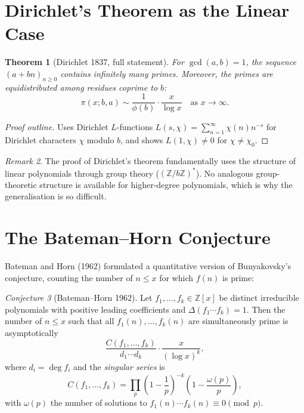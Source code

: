 \documentclass[12pt,a4paper]{amsart}
\newtheorem{theorem}{Theorem}[section]
\theoremstyle{definition}
\theoremstyle{remark}
\newtheorem{remark}[theorem]{Remark}
\newtheorem{conjecture}[theorem]{Conjecture}
\newcommand{\Z}{\mathbb{Z}}
\begin{document}
\section{Dirichlet's Theorem as the Linear Case}

\begin{theorem}[Dirichlet 1837, full statement]
For $\gcd(a, b) = 1$, the sequence $(a + bn)_{n \geq 0}$ contains infinitely
many primes.
Moreover, the primes are equidistributed among residues coprime to $b$:
\[
  \pi(x; b, a) \sim \frac{1}{\phi(b)} \cdot \frac{x}{\log x} \quad
  \text{as } x \to \infty.
\]
\end{theorem}

\begin{proof}[Proof outline]
Uses Dirichlet $L$-functions $L(s, \chi) = \sum_{n=1}^\infty \chi(n) n^{-s}$
for Dirichlet characters $\chi$ modulo $b$, and shows $L(1, \chi) \neq 0$
for $\chi \neq \chi_0$.
\end{proof}

\begin{remark}
The proof of Dirichlet's theorem fundamentally uses the structure of linear
polynomials through group theory ($(\Z/b\Z)^*$).
No analogous group-theoretic structure is available for higher-degree polynomials,
which is why the generalisation is so difficult.
\end{remark}

\section{The Bateman--Horn Conjecture}

Bateman and Horn (1962) formulated a quantitative version of Bunyakovsky's
conjecture, counting the number of $n \leq x$ for which $f(n)$ is prime:

\begin{conjecture}[Bateman--Horn 1962]
\label{conj:BH}
Let $f_1, \ldots, f_k \in \Z[x]$ be distinct irreducible polynomials with
positive leading coefficients and $\Delta(f_1 \cdots f_k) = 1$.
Then the number of $n \leq x$ such that all $f_1(n), \ldots, f_k(n)$ are
simultaneously prime is asymptotically
\[
  \frac{C(f_1, \ldots, f_k)}{d_1 \cdots d_k} \cdot \frac{x}{(\log x)^k},
\]
where $d_i = \deg f_i$ and the \emph{singular series} is
\[
  C(f_1, \ldots, f_k)
  = \prod_p \left(1 - \frac{1}{p}\right)^{-k}
    \left(1 - \frac{\omega(p)}{p}\right),
\]
with $\omega(p)$ the number of solutions to $f_1(n) \cdots f_k(n) \equiv 0 \pmod{p}$.
\end{conjecture}
\end{document}
